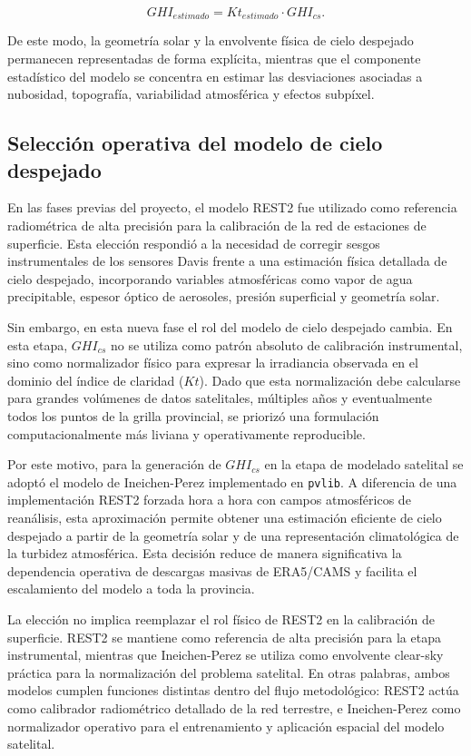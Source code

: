\documentclass[../main.tex]{subfiles}
\begin{document}
\begin{equation}
GHI_{estimado} = Kt_{estimado} \cdot GHI_{cs}.
\end{equation}

De este modo, la geometría solar y la envolvente física de cielo despejado permanecen representadas de forma explícita, mientras que el componente estadístico del modelo se concentra en estimar las desviaciones asociadas a nubosidad, topografía, variabilidad atmosférica y efectos subpíxel.

\subsection{Selección operativa del modelo de cielo despejado}

En las fases previas del proyecto, el modelo REST2 fue utilizado como referencia radiométrica de alta precisión para la calibración de la red de estaciones de superficie. Esta elección respondió a la necesidad de corregir sesgos instrumentales de los sensores Davis frente a una estimación física detallada de cielo despejado, incorporando variables atmosféricas como vapor de agua precipitable, espesor óptico de aerosoles, presión superficial y geometría solar.

Sin embargo, en esta nueva fase el rol del modelo de cielo despejado cambia. En esta etapa, $GHI_{cs}$ no se utiliza como patrón absoluto de calibración instrumental, sino como normalizador físico para expresar la irradiancia observada en el dominio del índice de claridad ($Kt$). Dado que esta normalización debe calcularse para grandes volúmenes de datos satelitales, múltiples años y eventualmente todos los puntos de la grilla provincial, se priorizó una formulación computacionalmente más liviana y operativamente reproducible.

Por este motivo, para la generación de $GHI_{cs}$ en la etapa de modelado satelital se adoptó el modelo de Ineichen-Perez implementado en \texttt{pvlib}. A diferencia de una implementación REST2 forzada hora a hora con campos atmosféricos de reanálisis, esta aproximación permite obtener una estimación eficiente de cielo despejado a partir de la geometría solar y de una representación climatológica de la turbidez atmosférica. Esta decisión reduce de manera significativa la dependencia operativa de descargas masivas de ERA5/CAMS y facilita el escalamiento del modelo a toda la provincia.

La elección no implica reemplazar el rol físico de REST2 en la calibración de superficie. REST2 se mantiene como referencia de alta precisión para la etapa instrumental, mientras que Ineichen-Perez se utiliza como envolvente clear-sky práctica para la normalización del problema satelital. En otras palabras, ambos modelos cumplen funciones distintas dentro del flujo metodológico: REST2 actúa como calibrador radiométrico detallado de la red terrestre, e Ineichen-Perez como normalizador operativo para el entrenamiento y aplicación espacial del modelo satelital.
\end{document}
